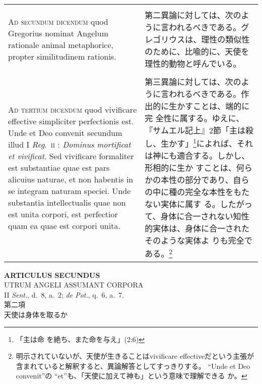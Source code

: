 \documentclass[10pt]{jsarticle} %
\begin{document}
\begin{longtable}{p{21em}p{21em}}
\\\\

{\scshape Ad secundum dicendum} quod Gregorius nominat
Angelum rationale animal metaphorice, propter similitudinem rationis.

&

 第二異論に対しては、次のように言われるべきである。グレゴリウスは、理性の類似性
のために、比喩的に、天使を理性的動物と呼んでいる。

\\\\

{\scshape Ad tertium dicendum} quod vivificare effective simpliciter
perfectionis est. Unde et Deo convenit secundum illud I {\itshape
Reg}.~{\scshape ii} : {\itshape Dominus mortificat et vivificat}. Sed
vivificare formaliter est substantiae quae est pars alicuius naturae, et
non habentis in se integram naturam speciei. Unde substantia
intellectualis quae non est unita corpori, est perfectior quam ea quae
est corpori unita.

&

第三異論に対しては、次のように言われるべきである。作出的に生かすことは、端的に完
全性に属する。ゆえに、『サムエル記上』2節「主は殺し、生かす」\footnote{「主は命
を絶ち、また命を与え」(2:6)}によれば、それは神にも適合する。しかし、形相的に生か
すことは、何らかの本性の部分であり、自らの中に種の完全な本性をもたない実体に属す
る。したがって、身体に合一されない知性的実体は、身体に合一されたそのような実体よ
りも完全である。\footnote{明示されていないが、天使が生きることはvivificare
effectiveだという主張が含まれていると解釈すると、異論解答としてすっきりする。
``Unde et Deo convenit''の ``et''も、「天使に加えて神も」という意味で理解できる
か。}

\end{longtable}
\newpage

\begin{center}
 {\Large {\bf ARTICULUS SECUNDUS}}\\
 {\large UTRUM ANGELI ASSUMANT CORPORA}\\
 {\footnotesize II {\itshape Sent.}, d.~8, a.~2; {\itshape de Pot.},
 q.~6, a.~7.}\\
 {\Large 第二項\\天使は身体を取るか}
\end{center}
\end{document}
